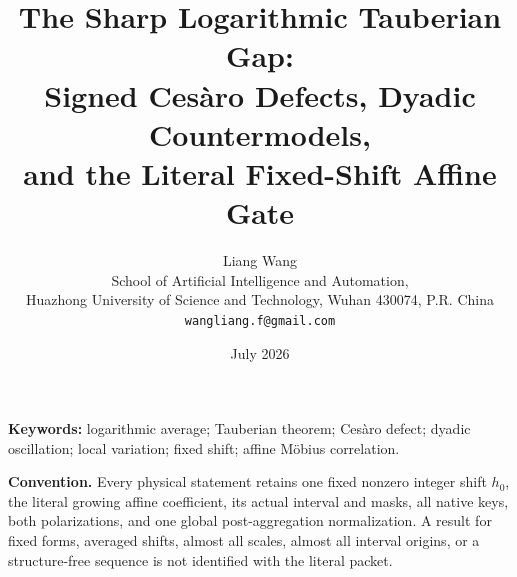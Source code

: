 \documentclass[11pt]{article}
\title{The Sharp Logarithmic Tauberian Gap:\\
Signed Ces\`aro Defects, Dyadic Countermodels,\\
and the Literal Fixed-Shift Affine Gate}
\author{Liang Wang\\
School of Artificial Intelligence and Automation,\\
Huazhong University of Science and Technology, Wuhan 430074, P.R. China\\
\texttt{wangliang.f@gmail.com}}
\date{July 2026}
\theoremstyle{remark}
\begin{document}
\maketitle



\noindent\textbf{Keywords:} logarithmic average; Tauberian theorem;
Ces\`aro defect; dyadic oscillation; local variation; fixed shift;
affine M\"obius correlation.

\medskip
\noindent\textbf{Convention.}
Every physical statement retains one fixed nonzero integer shift
\(h_0\), the literal growing affine coefficient, its actual interval
and masks, all native keys, both polarizations, and one global
post-aggregation normalization.  A result for fixed forms, averaged
shifts, almost all scales, almost all interval origins, or a
structure-free sequence is not identified with the literal packet.










\begingroup
\footnotesize
\raggedright


\endgroup
\end{document}
